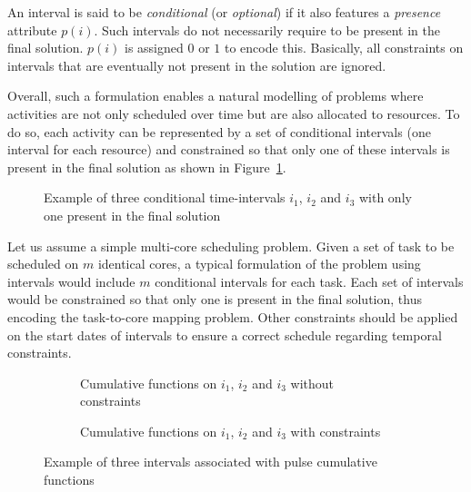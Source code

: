 \documentclass[main.tex]{subfiles}
\begin{document}
An interval is said to be \emph{conditional} (or \emph{optional}) if it also
features a \emph{presence} attribute $p(i)$. Such intervals do not necessarily
require to be present in the final solution. $p(i)$ is assigned $0$ or $1$ to
encode this. Basically, all constraints on intervals that are eventually not
present in the solution are ignored. 

Overall, such a formulation enables a natural modelling of problems where
activities are not only scheduled over time but are also allocated to
resources. To do so, each activity can be represented by a set of conditional
intervals (one interval for each resource) and constrained so that only one of
these intervals is present in the final solution as shown in
Figure~\ref{fig_validation_condTimeInterval}. 

\begin{figure}
    \centering
    \scalebox{0.8}{}
    \caption{Example of three conditional time-intervals $i_1$, $i_2$ and $i_3$
    with only one present in the final solution}
    \label{fig_validation_condTimeInterval}
\end{figure}

\begin{example}
    Let us assume a simple multi-core scheduling problem. Given a set of task
    to be scheduled on $m$ identical cores, a typical formulation of the
    problem using intervals would include $m$ conditional intervals for each
    task. Each set of intervals would be constrained so that only one is
    present in the final solution, thus encoding the task-to-core mapping
    problem. Other constraints should be applied on the start dates of
    intervals to ensure a correct schedule regarding temporal constraints. 
\end{example}

\begin{figure}
    \centering
    \begin{subfigure}[b]{\linewidth}
        \centering
        \scalebox{0.9}{}
        \caption{Cumulative functions on $i_1$, $i_2$ and $i_3$ without constraints}
        \label{fig_validation_pulseFunctionNoConst}
    \end{subfigure}\vspace{5mm}
    \begin{subfigure}[b]{\linewidth}
        \centering
        \scalebox{0.9}{}
        \caption{Cumulative functions on $i_1$, $i_2$ and $i_3$ with constraints}
        \label{fig_validation_pulseFunctionWithConst}
    \end{subfigure}
    \caption{Example of three intervals associated with pulse cumulative functions}
    \label{fig_validation_pulseFunction}
\end{figure}
\end{document}
